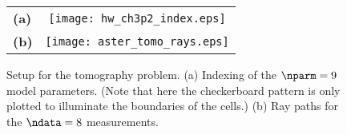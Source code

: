 \documentclass[11pt,titlepage,fleqn]{article}
\begin{document}


\begin{figure}[h]
\centering
\begin{tabular}{lc}
{\bf(a)} & \texttt{[image: hw\_ch3p2\_index.eps]} \\
{\bf(b)} & \texttt{[image: aster\_tomo\_rays.eps]} \\
\end{tabular}
\caption[]
{{
Setup for the tomography problem.
(a) Indexing of the $\nparm=9$ model parameters.
(Note that here the checkerboard pattern is only plotted to illuminate the boundaries of the cells.)
(b) Ray paths for the $\ndata=8$ measurements.
\label{fig:index}
}}
\end{figure} 

\end{document}
